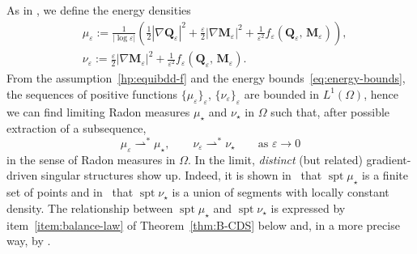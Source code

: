\documentclass[a4paper, 11pt, twoside, leqno]{article}
\theoremstyle{definition}              %
\theoremstyle{remark}                  %
\DeclareMathOperator{\spt}{spt}                                     %
\newcommand{\abs}[1]{\left| #1 \right|}                             %
\newcommand{\Q}{\mathbf{Q}}
\newcommand{\M}{\mathbf{M}}
\newcommand{\eps}{\varepsilon}
\begin{document}
As in \cite{CDS1, CDS2}, we define the energy densities
\begin{align}
    &\mu_\eps := \frac{1}{\abs{\log\eps}} \left( \frac{1}{2} \abs{\nabla \Q_\eps}^2 + \frac{\eps}{2} \abs{\nabla \M_\eps}^2 + \frac{1}{\eps^2} f_\eps(\Q_\eps,\,\M_\eps) \right), \\
    &\nu_\eps := \frac{\eps}{2} \abs{\nabla \M_\eps}^2 + \frac{1}{\eps^2} f_\eps(\Q_\eps,\,\M_\eps).
\end{align}
From the assumption~\eqref{hp:equibdd-f} and the energy 
bounds~\eqref{eq:energy-bounds}, 
the sequences of positive functions $\{\mu_\eps\}_\eps$, $\{ \nu_\eps \}_\eps$ are bounded in $L^1(\Omega)$, hence we can find limiting Radon measures $\mu_\star$ and $\nu_\star$ in $\Omega$ such that, after possible extraction of a subsequence,
\[
    \mu_\eps \rightharpoonup^* \mu_\star, 
    \qquad 
    \nu_\eps \rightharpoonup^* \nu_\star
    \qquad 
    \mbox{as } \eps \to 0
\]
in the sense of Radon measures in $\Omega$. 
In the limit, \emph{distinct} (but related) gradient-driven singular 
structures show up. 
Indeed, it is shown in~\cite{CDS1} that $\spt\mu_\star$ is a finite 
set of points and in~\cite{CDS2} that $\spt\nu_\star$ is a union of 
segments with locally constant density. The relationship between 
$\spt\mu_\star$ and $\spt\nu_\star$ is expressed by item~\ref{item:balance-law} 
of Theorem~\ref{thm:B-CDS} below and, in a more precise way, by 
\cite[Theorem~C]{CDS2}.
 
\end{document}
